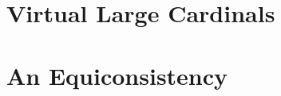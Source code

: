 



\frontmatter




\setcounter{tocdepth}{2}
\tableofcontents
\thispagestyle{fancy}





\mainmatter

\newpage\part{Virtual Large Cardinals}



\newpage\part{An Equiconsistency}






\appendix


\backmatter
\pagestyle{fancy}

\nocite{*}



